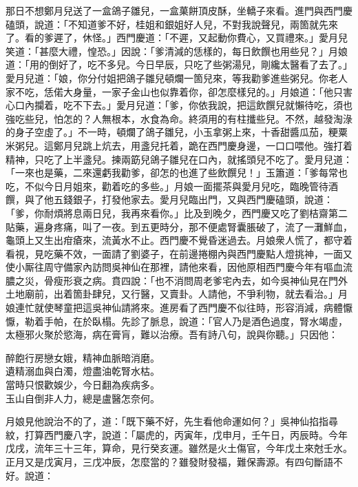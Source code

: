 那日不想鄭月兒送了一盒鴿子雛兒，一盒菓餅頂皮酥，坐轎子來看。進門與西門慶磕頭，說道：「不知道爹不好，桂姐和銀姐好人兒，不對我說聲兒，兩箇就先來了。看的爹遲了，休怪。」西門慶道：「不遲，又起動你費心，又買禮來。」愛月兒笑道：「甚麼大禮，惶恐。」因說：「爹清減的恁樣的，每日飲饌也用些兒？」月娘道：「用的倒好了，吃不多兒。今日早辰，只吃了些粥湯兒，剛纔太醫看了去了。」愛月兒道：「娘，你分付姐把鴿子雛兒頓爛一箇兒來，等我勸爹進些粥兒。你老人家不吃，恁偌大身量，一家子金山也似靠着你，卻怎麼樣兒的。」月娘道：「他只害心口內攔着，吃不下去。」愛月兒道：「爹，你依我說，把這飲饌兒就懶待吃，須也強吃些兒，怕怎的？人無根本，水食為命。終須用的有柱攕些兒。不然，越發淘淥的身子空虛了。」不一時，頓爛了鴿子雛兒，小玉拿粥上來，十香甜醬瓜茄，粳粟米粥兒。這鄭月兒跳上炕去，用盞兒托着，跪在西門慶身邊，一口口喂他。強打着精神，只吃了上半盞兒。揀兩筯兒鴿子雛兒在口內，就搖頭兒不吃了。愛月兒道：「一來也是藥，{}二來還虧我勸爹，卻怎的也進了些飲饌兒！」玉簫道：「爹每常也吃，不似今日月姐來，勸着吃的多些。」月娘一面擺茶與愛月兒吃，臨晚管待酒饌，與了他五錢銀子，打發他家去。愛月兒臨出門，又與西門慶磕頭，說道：「爹，你耐煩將息兩日兒，我再來看你。」比及到晚夕，西門慶又吃了劉桔齋第二貼藥，遍身疼痛，叫了一夜。到五更時分，那不便處腎囊脹破了，流了一灘鮮血，龜頭上又生出疳瘡來，流黃水不止。{}西門慶不覺昏迷過去。月娘衆人慌了，都守着看視，見吃藥不效，一面請了劉婆子，在前邊捲棚內與西門慶點人燈挑神，一面又使小厮往周守備家內訪問吳神仙在那裡，請他來看，因他原相西門慶今年有嘔血流膿之災，骨瘦形衰之病。賁四說：「也不消問周老爹宅內去，如今吳神仙見在門外土地廟前，出着箇卦肆兒，又行醫，又賣卦。人請他，不爭利物，就去看治。」月娘連忙就使琴童把這吳神仙請將來。進房看了西門慶不似往時，形容消減，病體懨懨，勒着手帕，在於臥榻。先診了脈息，說道：「官人乃是酒色過度，腎水竭虛，太極邪火聚於慾海，病在膏肓，難以治療。吾有詩八句，說與你聽。」只因他：

\begin{myquote} 
醉飽行房戀女娥，精神血脈暗消磨。\\遺精溺血與白濁，燈盡油乾腎水枯。\\當時只恨歡娛少，今日翻為疾病多。\\玉山自倒非人力，總是盧醫怎奈何。
\end{myquote} 

月娘見他說治不的了，道：「既下藥不好，先生看他命運如何？」吳神仙掐指尋紋，打算西門慶八字，說道：「屬虎的，丙寅年，戊申月，壬午日，丙辰時。今年戊戌，流年三十三年，算命，見行癸亥運。雖然是火土傷官，今年戊土來尅壬水。正月又是戊寅月，三戊冲辰，怎麼當的？雖發財發福，難保壽源。有四句斷語不好。說道：

